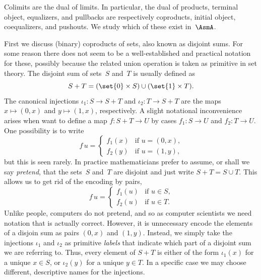 Colimits are the dual of limits. In particular, the dual of products,
terminal object, equalizers, and pullbacks are respectively
coproducts, initial object, coequalizers, and pushouts. We study which
of these exist in~$\AsmA$.

First we discuss (binary) coproducts of sets, also known as disjoint
sums. For some reason there does not seem to be a well-established and
practical notation for these, possibly because the related union
operation is taken as primitive in set theory. The disjoint sum of
sets~$S$ and~$T$ is usually defined as
%
\begin{equation*}
  S + T = (\set{0} \times S) \cup (\set{1} \times T).
\end{equation*}
%
The canonical injections $\iota_1 : S \to S + T$ and $\iota_2 : T \to
S + T$ are the maps $x \mapsto (0,x)$ and $y \mapsto (1,x)$,
respectively. A slight notational inconvenience arises when want to
define a map $f : S + T \to U$ by cases $f_1 : S \to U$ and $f_2 : T
\to U$. One possibility is to write
%
\begin{equation*}
  f\,u =
  \begin{cases}
    f_1(x) & \text{if $u = (0,x)$,}\\
    f_2(y) & \text{if $u = (1,y)$,}
  \end{cases}
\end{equation*}
%
but this is seen rarely. In practice mathematicians prefer to assume,
or shall we say \emph{pretend}, that the sets~$S$ and~$T$ are disjoint
and just write $S + T = S \cup T$. This allows us to get rid of the
encoding by pairs,
%
\begin{equation*}
  f\,u =
  \begin{cases}
    f_1(u) & \text{if $u \in S$,}\\
   f_2(u) & \text{if $u \in T$.}
  \end{cases}
\end{equation*}
%
Unlike people, computers do not pretend, and so as computer scientists we need notation that is actually correct. However, it is unnecessary encode the elements of a disjoin sum as pairs $(0,x)$ and $(1,y)$. Instead, we simply take the injections $\iota_1$ and
$\iota_2$ as primitive \emph{labels} that indicate which part of a disjoint sum we are referring to.  Thus, every element of $S + T$ is either of the form $\iota_1(x)$ for a unique $x \in S$, or $\iota_2(y)$ for a unique $y \in T$. In a specific case we may choose different, descriptive names for the injections.

